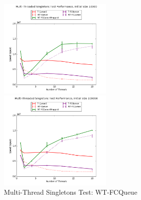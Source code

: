 \begin{figure}[H]
    \centering
    \includegraphics[width=0.5\textwidth]{fcqueues/lpQ:RandSingleOps10000.png}
    
    \includegraphics[width=0.5\textwidth]{fcqueues/lpQ:RandSingleOps100000.png}
    
\caption{Multi-Thread Singletons Test: WT-FCQueue}
\label{fig:wtqueues}
\end{figure}
